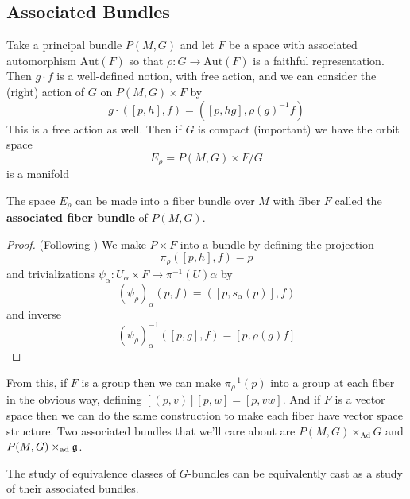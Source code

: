 		\subsection{Associated Bundles}
		Take a principal bundle $P(M,G)$ and let $F$ be a space with associated automorphism $\mathrm{Aut}(F)$ so that $\rho: G \rightarrow \mathrm{Aut}(F)$ is a faithful representation. Then $g \cdot f$ is a well-defined notion, with free action, and we can consider the (right) action of $G$ on $P(M,G) \times F$ by
		\begin{equation}
			g \cdot ([p, h], f) = ([p, hg], \rho(g)^{-1} f)
		\end{equation}
		This is a free action as well. Then if $G$ is compact (important) we have the orbit space
		\begin{equation}
			E_\rho = P(M,G) \times F/G
		\end{equation}
		is a manifold
		
		\begin{theorem}
			The space $E_\rho$ can be made into a fiber bundle over $M$ with fiber $F$ called the \textbf{associated fiber bundle} of $P(M,G)$. 
		\end{theorem}
		\begin{proof}
			(Following \cite{lindenhovius2011})
			We make $P \times F$ into a bundle by defining the projection 
			\begin{equation}
				\pi_\rho ([p, h], f) = p
			\end{equation}
			and trivializations $\psi_\alpha: U_\alpha \times F \rightarrow \pi^{-1}(U)\alpha$ by
			\begin{equation}
				(\psi_\rho)_\alpha (p, f) = ([p, s_\alpha (p)] , f)
			\end{equation}
			and inverse
			\begin{equation}
				(\psi_\rho)_\alpha^{-1} ([p, g], f) = [p, \rho(g) f]
			\end{equation}
		\end{proof}
		
		From this, if $F$ is a group then we can make $\pi_\rho^{-1}(p)$ into a group at each fiber in the obvious way, defining $[(p, v)][p, w] = [p, v w]$. And if $F$ is a vector space then we can do the same construction to make each fiber have vector space structure.		
		Two associated bundles that we'll care about are $P(M,G) \times_{\mathrm{Ad}} G$ and $P(M,G) \times_{\mathrm{ad}} \frak g$.
		
		The study of equivalence classes of $G$-bundles can be equivalently cast as a study of their associated bundles. 
		
